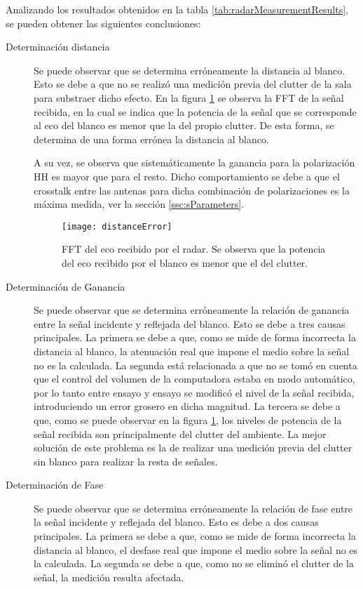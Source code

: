 Analizando los resultados obtenidos en la tabla \ref{tab:radarMeasurementResults}, se pueden obtener las siguientes conclusiones:
\begin{description}
  \item[Determinación distancia] Se puede observar que se determina erróneamente la distancia al blanco. Esto se debe a que no se realizó una medición previa del clutter de la sala para substraer dicho efecto. En la figura \ref{fig:distanceError} se observa la FFT de la señal recibida, en la cual se indica que la potencia de la señal que se corresponde al eco del blanco es menor que la del propio clutter. De esta forma, se determina de una forma errónea la distancia al blanco.

  A su vez, se observa que sistemáticamente la ganancia para la polarización HH es mayor que para el resto. Dicho comportamiento se debe a que el crosstalk entre las antenas para dicha combinación de polarizaciones es la máxima medida, ver la sección \ref{ssc:sParameters}.

  \begin{figure}[H]
    \centering
    \texttt{[image: distanceError]}
    \caption{FFT del eco recibido por el radar. Se observa que la potencia del eco recibido por el blanco es menor que el del clutter.}
    \label{fig:distanceError}
  \end{figure}

  \item[Determinación de Ganancia] Se puede observar que se determina erróneamente la relación de ganancia entre la señal incidente y reflejada del blanco. Esto se debe a tres causas principales. La primera se debe a que, como se mide de forma incorrecta la distancia al blanco, la atenuación real que impone el medio sobre la señal no es la calculada. La segunda está relacionada a que no se tomó en cuenta que el control del volumen de la computadora estaba en modo automático, por lo tanto entre ensayo y ensayo se modificó el nivel de la señal recibida, introduciendo un error grosero en dicha magnitud. La tercera se debe a que, como se puede observar en la figura \ref{fig:distanceError}, los niveles de potencia de la señal recibida son principalmente del clutter del ambiente. La mejor solución de este problema es la de realizar una medición previa del clutter sin blanco para realizar la resta de señales.

  \item[Determinación de Fase] Se puede observar que se determina erróneamente la relación de fase entre la señal incidente y reflejada del blanco. Esto es debe a dos causas principales. La primera se debe a que, como se mide de forma incorrecta la distancia al blanco, el desfase real que impone el medio sobre la señal no es la calculada. La segunda se debe a que, como no se eliminó el clutter de la señal, la medición resulta afectada.
\end{description}


